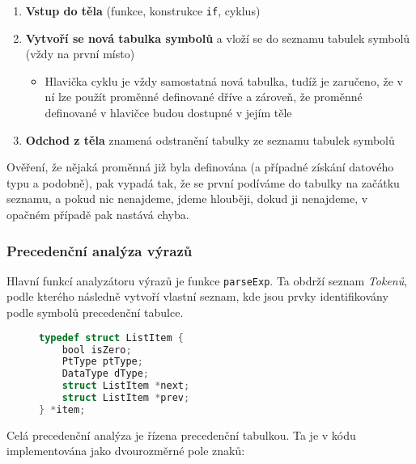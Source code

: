 \documentclass[czech,a4paper,12pt]{article}[]
\begin{document}
\begin{inpar}
\begin{inpar}
\begin{enumerate}
    \item \textbf{Vstup do těla} (funkce, konstrukce \texttt{if}, cyklus)
    \item \textbf{Vytvoří se nová tabulka symbolů} a vloží se do seznamu tabulek symbolů (vždy na první místo)
    \begin{itemize}
        \item Hlavička cyklu je vždy samostatná nová tabulka, tudíž je zaručeno, že v ní lze použít proměnné definované dříve a zároveň, že proměnné definované v hlavičce budou dostupné v jejím těle
    \end{itemize}
    \item \textbf{Odchod z těla} znamená odstranění tabulky ze seznamu tabulek symbolů
\end{enumerate}

Ověření, že nějaká proměnná již byla definována (a případné získání datového typu a podobně), pak vypadá tak, že se první podíváme do tabulky na začátku seznamu, a pokud nic nenajdeme, jdeme hlouběji, dokud ji nenajdeme, v opačném případě pak nastává chyba.

\subsubsection{Precedenční analýza výrazů}
Hlavní funkcí analyzátoru výrazů je funkce \texttt{parseExp}. Ta obdrží seznam \emph{Tokenů}, podle kterého následně vytvoří vlastní seznam, kde jsou prvky identifikovány podle symbolů precedenční tabulce.

\begin{figure}[h!]
    \begin{lstlisting}[language=C, caption={Položka seznamu pro precedenční analýzu}, captionpos=b]
typedef struct ListItem {
    bool isZero;
    PtType ptType;
    DataType dType;
    struct ListItem *next;
    struct ListItem *prev;
} *item;
    \end{lstlisting}
\label{exprCode}
\end{figure}

\newpage

Celá precedenční analýza je řízena precedenční tabulkou. Ta je v kódu implementována jako dvourozměrné pole znaků:


\end{inpar}
\end{inpar}
\end{document}
